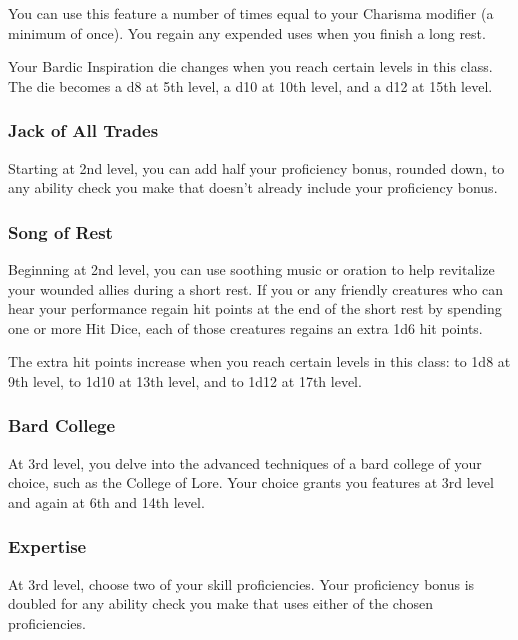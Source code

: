 You can use this feature a number of times equal to your Charisma
modifier (a minimum of once). You regain any expended uses when you
finish a long rest.

Your Bardic Inspiration die changes when you reach certain levels in
this class. The die becomes a d8 at 5th level, a d10 at 10th level, and
a d12 at 15th level.

\hypertarget{jack-of-all-trades}{%
\subsubsection{Jack of All Trades}\label{jack-of-all-trades}}

Starting at 2nd level, you can add half your proficiency bonus, rounded
down, to any ability check you make that doesn't already include your
proficiency bonus.

\hypertarget{song-of-rest}{%
\subsubsection{Song of Rest}\label{song-of-rest}}

Beginning at 2nd level, you can use soothing music or oration to help
revitalize your wounded allies during a short rest. If you or any
friendly creatures who can hear your performance regain hit points at
the end of the short rest by spending one or more Hit Dice, each of
those creatures regains an extra 1d6 hit points.

The extra hit points increase when you reach certain levels in this
class: to 1d8 at 9th level, to 1d10 at 13th level, and to 1d12 at 17th
level.

\hypertarget{bard-college}{%
\subsubsection{Bard College}\label{bard-college}}

At 3rd level, you delve into the advanced techniques of a bard college
of your choice, such as the College of Lore. Your choice grants you
features at 3rd level and again at 6th and 14th level.

\hypertarget{expertise}{%
\subsubsection{Expertise}\label{expertise}}

At 3rd level, choose two of your skill proficiencies. Your proficiency
bonus is doubled for any ability check you make that uses either of the
chosen proficiencies.


